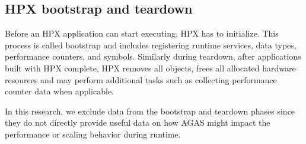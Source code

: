 \subsection{HPX bootstrap and teardown}
Before an HPX application can start executing, HPX has to initialize. This
process is called bootstrap and includes registering runtime services, data
types, performance counters\cite{grubel2015performance}, and symbols.
Similarly during teardown, after applications built with HPX complete, HPX removes all
objects, frees all allocated hardware resources and may perform additional
tasks such as collecting performance counter data when applicable.

In this research, we exclude data from the bootstrap and teardown phases since
they do not directly provide useful data on how AGAS might impact the
performance or scaling behavior during runtime.
